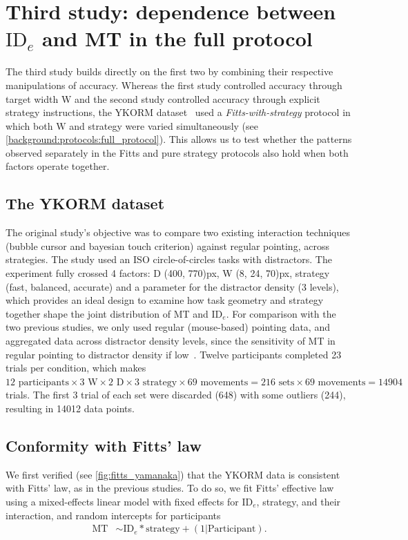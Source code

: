 \documentclass[acmlarge, manuscript,review]{acmart}
\newcommand{\mt}{\ensuremath{{\text{MT}}}\xspace}
\newcommand{\ide}{\ensuremath{{\text{ID}_e}}\xspace}
\newcommand{\W}{\ensuremath{{\text{W}}}\xspace}
\begin{document}
\section{ Third study: dependence between \ide and MT in the full protocol \label{sec:yamanaka}}
The third study builds directly on the first two by combining their respective manipulations of accuracy. Whereas the first study controlled accuracy through target width \W and the second study controlled accuracy through explicit strategy instructions, the YKORM dataset~\cite{yamanaka2023} used a \textit{Fitts-with-strategy} protocol in which both \W and strategy were varied simultaneously (see \autoref{background:protocols:full_protocol}). This allows us to test whether the patterns observed separately in the Fitts and pure strategy protocols also hold when both factors operate together.

\subsection{The YKORM dataset}
The original study's objective was to compare two existing interaction techniques (bubble cursor and bayesian touch criterion) against regular pointing, across strategies.
The study used an ISO circle-of-circles tasks with distractors.
The experiment fully crossed 4 factors: D (400, 770)px, W (8, 24, 70)px, strategy (fast, balanced, accurate) and a parameter for the distractor density (3 levels), which provides an ideal design to examine how task geometry and strategy together shape the joint distribution of MT and \ide.
For comparison with the two previous studies, we only used regular (mouse-based) pointing data, and aggregated data across distractor density levels, since the sensitivity of MT in regular pointing to distractor density if low~\cite[Table 2]{blanch2011}.
Twelve participants completed 23 trials per condition, which makes $12 \text{ participants} \times 3 \text{ W} \times 2 \text{ D} \times 3 \text{ strategy} \times 69 \text{ movements} = 216 \text{ sets} \times 69 \text{ movements} = 14904$ trials. The first 3 trial of each set were discarded (648) with some outliers (244), resulting in 14012 data points.

\subsection{Conformity with Fitts' law}
We first verified (see \autoref{fig:fitts_yamanaka}) that the YKORM data is consistent with Fitts' law, as in the previous studies. To do so, we fit Fitts' effective law using a mixed-effects linear model with fixed effects for \ide, strategy, and their interaction, and random intercepts for participants
\begin{align}
	\mt & \sim \ide * \text{strategy} + (1|\text{Participant}).
\end{align}
\end{document}
